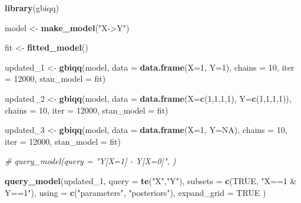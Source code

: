 \documentclass[12pt,]{book}
\newenvironment{Shaded}{\begin{snugshade}}{\end{snugshade}}
\newcommand{\CommentTok}[1]{\textcolor[rgb]{0.56,0.35,0.01}{\textit{#1}}}
\newcommand{\DataTypeTok}[1]{\textcolor[rgb]{0.13,0.29,0.53}{#1}}
\newcommand{\DecValTok}[1]{\textcolor[rgb]{0.00,0.00,0.81}{#1}}
\newcommand{\KeywordTok}[1]{\textcolor[rgb]{0.13,0.29,0.53}{\textbf{#1}}}
\newcommand{\NormalTok}[1]{#1}
\newcommand{\OtherTok}[1]{\textcolor[rgb]{0.56,0.35,0.01}{#1}}
\newcommand{\StringTok}[1]{\textcolor[rgb]{0.31,0.60,0.02}{#1}}
\begin{document}
\begin{Shaded}
\begin{Highlighting}[]
\KeywordTok{library}\NormalTok{(gbiqq)}

\NormalTok{model <-}\StringTok{ }\KeywordTok{make_model}\NormalTok{(}\StringTok{"X->Y"}\NormalTok{)}

\NormalTok{fit <-}\StringTok{ }\KeywordTok{fitted_model}\NormalTok{()}

\NormalTok{updated_}\DecValTok{1}\NormalTok{ <-}\StringTok{ }\KeywordTok{gbiqq}\NormalTok{(model, }\DataTypeTok{data =} \KeywordTok{data.frame}\NormalTok{(}\DataTypeTok{X=}\DecValTok{1}\NormalTok{, }\DataTypeTok{Y=}\DecValTok{1}\NormalTok{), }
                                     \DataTypeTok{chains =} \DecValTok{10}\NormalTok{, }\DataTypeTok{iter =} \DecValTok{12000}\NormalTok{, }\DataTypeTok{stan_model =}\NormalTok{ fit)}

\NormalTok{updated_}\DecValTok{2}\NormalTok{ <-}\StringTok{ }\KeywordTok{gbiqq}\NormalTok{(model, }\DataTypeTok{data =} \KeywordTok{data.frame}\NormalTok{(}\DataTypeTok{X=}\KeywordTok{c}\NormalTok{(}\DecValTok{1}\NormalTok{,}\DecValTok{1}\NormalTok{,}\DecValTok{1}\NormalTok{,}\DecValTok{1}\NormalTok{), }\DataTypeTok{Y=}\KeywordTok{c}\NormalTok{(}\DecValTok{1}\NormalTok{,}\DecValTok{1}\NormalTok{,}\DecValTok{1}\NormalTok{,}\DecValTok{1}\NormalTok{)), }
                                     \DataTypeTok{chains =} \DecValTok{10}\NormalTok{, }\DataTypeTok{iter =} \DecValTok{12000}\NormalTok{, }\DataTypeTok{stan_model =}\NormalTok{ fit)}

\NormalTok{updated_}\DecValTok{3}\NormalTok{ <-}\StringTok{ }\KeywordTok{gbiqq}\NormalTok{(model, }\DataTypeTok{data =} \KeywordTok{data.frame}\NormalTok{(}\DataTypeTok{X=}\DecValTok{1}\NormalTok{, }\DataTypeTok{Y=}\OtherTok{NA}\NormalTok{), }
                                     \DataTypeTok{chains =} \DecValTok{10}\NormalTok{, }\DataTypeTok{iter =} \DecValTok{12000}\NormalTok{, }\DataTypeTok{stan_model =}\NormalTok{ fit)}

\CommentTok{# query_model(query = "Y[X=1] - Y[X=0]", )}

\KeywordTok{query_model}\NormalTok{(updated_}\DecValTok{1}\NormalTok{, }
                        \DataTypeTok{query =} \KeywordTok{te}\NormalTok{(}\StringTok{"X"}\NormalTok{,}\StringTok{"Y"}\NormalTok{), }
                        \DataTypeTok{subsets =} \KeywordTok{c}\NormalTok{(}\OtherTok{TRUE}\NormalTok{, }\StringTok{"X==1 & Y==1"}\NormalTok{), }
                        \DataTypeTok{using =} \KeywordTok{c}\NormalTok{(}\StringTok{"parameters"}\NormalTok{, }\StringTok{"posteriors"}\NormalTok{), }
                        \DataTypeTok{expand_grid =} \OtherTok{TRUE}\NormalTok{ )}


\end{Highlighting}
\end{Shaded}
\end{document}
